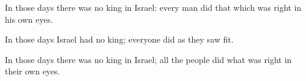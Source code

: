 			\begin{versebox}
					\item[BHS] 
					\item[ASV] In those days there was no king in Israel: every man did that which was right in his own eyes.
					\item[NIV] In those days Israel had no king; everyone did as they saw fit.
					\item[NRSV] In those days there was no king in Israel; all the people did what was right in their own eyes.
			\end{versebox}

